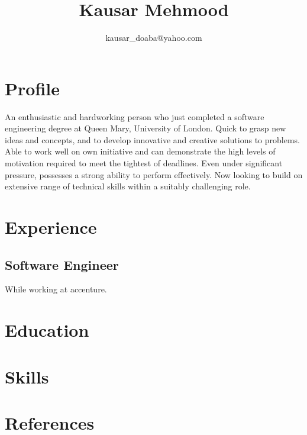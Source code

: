 \documentclass[10pt]{article}
\title{Kausar Mehmood}
\author{kausar\_doaba@yahoo.com}
\date{} %
\begin{document}

\maketitle

\section*{Profile}
An enthusiastic and hardworking person who just completed a software engineering degree at Queen Mary, University of London.
Quick to grasp new ideas and concepts, and to develop innovative and creative solutions to problems.
Able to work well on own initiative and can demonstrate the high levels of motivation required to meet the tightest of deadlines.
Even under significant pressure, possesses a strong ability to perform effectively.
Now looking to build on extensive range of technical skills within a suitably challenging role.

\section*{Experience}
\subsection*{Software Engineer}
While working at accenture.

\section*{Education}

\section*{Skills}

\section*{References}
\end{document}
